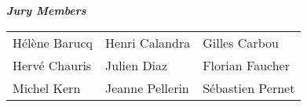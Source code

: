 \documentclass[red]{beamer}
\begin{document}
\begin{frame}[plain]
\maketitle
\small
{\centering\itshape \textbf{Jury Members} \vspace{0.5cm}\par}
\begin{tabular}[t]{l l l}
 Hélène Barucq  & Henri Calandra & Gilles Carbou \\
 Hervé Chauris & Julien Diaz & Florian Faucher \\
 Michel Kern & Jeanne Pellerin & Sébastien Pernet
\end{tabular}%
\end{frame}




\printbibliography
\end{document}

